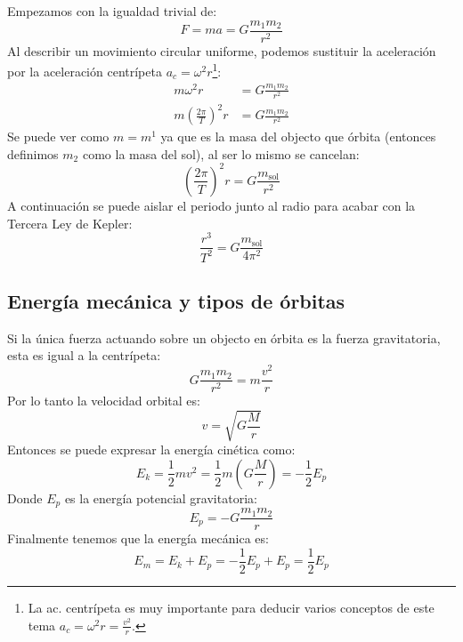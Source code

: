 \documentclass[arial,a4paper,print]{article}
\begin{document}
Empezamos con la igualdad trivial de:
\begin{equation*}
	F = ma= G\frac{m_{1}m_{2}}{r^2}
\end{equation*}
Al describir un movimiento circular uniforme, podemos sustituir la aceleración por la aceleración centrípeta $a_{c}=\omega^2 r$\footnote{La ac. centrípeta es muy importante para deducir varios conceptos de este tema $ a_{c}= \omega^{2}r =  \frac{v^{2}}{r}$.}:
\begin{align*}
	m\omega^2r &= G\frac{m_{1}m_{2}}{r^2} \\
	m\left(\frac{2\pi}{T}\right)^{2} r&= G\frac{m_{1}m_{2}}{r^2}
\end{align*}
Se puede ver como $m=m^1$ ya que es la masa del objecto que órbita (entonces definimos $m_{2}$ como la masa del sol), al ser lo mismo se cancelan:
\begin{equation*}
	\left(\frac{2\pi}{T}\right)^{2} r = G\frac{m_{\text{sol}}}{r^2}
\end{equation*}
A continuación se puede aislar el periodo junto al radio para acabar con la Tercera Ley de Kepler:
\begin{equation*}
	\frac{r^{3}}{T^{2}} = G\frac{m_{\text{sol}}}{4\pi^{2}}
\end{equation*}

\subsection{Energía mecánica y tipos de órbitas}
Si la única fuerza actuando sobre un objecto en órbita es la fuerza gravitatoria, esta es igual a la centrípeta: 
\begin{equation*}
	G\frac{m_{1}m_{2}}{r^{2}} = m\frac{v^{2}}{r}
\end{equation*}
Por lo tanto la velocidad orbital es:
\begin{equation*}
	v=\sqrt{G\frac Mr}
\end{equation*}
Entonces se puede expresar la energía cinética como:
\begin{equation*}
	E_{k} = \frac 12 mv^2=\frac12m\left(G\frac Mr\right) = -\frac12 E_{p}
\end{equation*}
Donde $ E_{p}$ es la energía potencial gravitatoria:
\begin{equation*}
	E_{p} = -G\frac{m_{1}m_{2}}{r}
\end{equation*}
Finalmente tenemos que la energía mecánica es:
\begin{equation*}
	E_{m} = E_{k} + E_{p} = -\frac12E_{p} + E_{p} = \frac12 E_{p}
\end{equation*}
\end{document}
